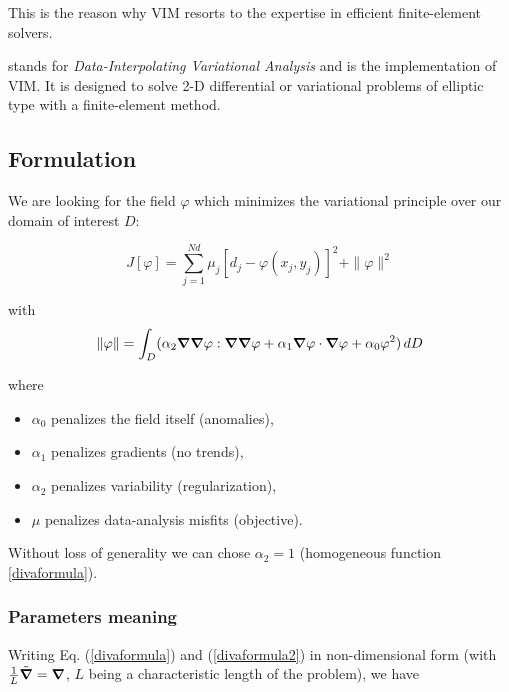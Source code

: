 This is the reason why VIM resorts to the expertise in efficient finite-element solvers.

\diva stands for \textit{Data-Interpolating Variational Analysis} and is the implementation of VIM. It is designed to solve 2-D differential or variational problems of elliptic type with a finite-element method.


\subsection{Formulation\label{sec:formulation}}

We are looking for the field $\varphi$ which minimizes the variational principle over our domain of interest $D$:

\begin{equation}
J \left[\varphi\right] =\sum_{j=1}^{Nd}\mu_{j}\left[d_{j}-\varphi(x_{j},y_{j})\right]^{2}+
\| \varphi\| ^{2}
\label{divaformula}
\end{equation}

with
\begin{equation}
\|\varphi\|=\int_{D}(
\alpha_{2} 
\boldsymbol{\nabla}\boldsymbol{\nabla}\varphi : \boldsymbol{\nabla}\boldsymbol{\nabla}\varphi +\alpha_{1}
\boldsymbol{\nabla}\varphi \cdot \boldsymbol{\nabla}\varphi + \alpha_{0} \varphi^{2})\, d D
\label{divaformula2}
\end{equation}

where
\begin{itemize}
\item
$\alpha_0$ penalizes the field itself (anomalies),
\item
$\alpha_1$ penalizes gradients (no trends),
\item 
$\alpha_2$ penalizes variability (regularization),
\item 
$\mu$ penalizes data-analysis misfits (objective).
\end{itemize}
Without loss of generality we can chose $\alpha_2=1$ (homogeneous function \ref{divaformula}).



\subsubsection{Parameters meaning\label{sec:parammeaning}}

Writing Eq. (\ref{divaformula}) and (\ref{divaformula2}) in non-dimensional form (with $\frac{1}{L}\tilde{\boldsymbol{\nabla}}=\boldsymbol{\nabla}$, $L$ being a characteristic length of the problem), we have

